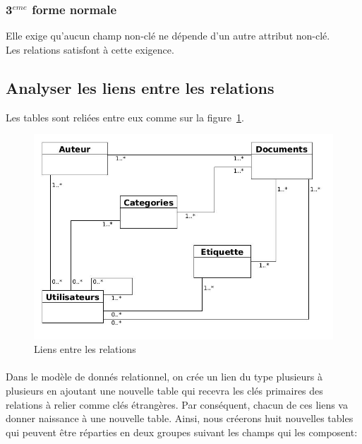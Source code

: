 				\vspace{1cm}


			\subsubsection{3$^{eme}$ forme normale}
				Elle exige qu'aucun champ non-cl\'e ne d\'epende d'un autre attribut non-cl\'e.\\
				Les relations satisfont \`a cette exigence.

				\vspace{1cm}



		\subsection{Analyser les liens entre les relations}
			Les tables sont reli\'ees entre eux comme sur la figure~\ref{RelationEntreTables}.


			\begin{figure}[!ht]
				\centering
				\includegraphics[width=0.75\linewidth]{Pictures/RelationEntreLesTables.jpg}
				\caption{Liens entre les relations}
				\label{RelationEntreTables}
			\end{figure}


			\paragraph{}Dans le mod\`ele de donn\'es relationnel, on cr\'ee un lien du type  plusieurs \`a plusieurs en ajoutant une nouvelle table qui recevra les cl\'es primaires des relations \`a relier comme cl\'es \'etrang\`eres. Par cons\'equent, chacun de ces liens va donner naissance \`a une nouvelle table. Ainsi, nous cr\'eerons huit nouvelles tables qui peuvent \^etre r\'eparties en deux groupes suivant les champs qui les composent:%

